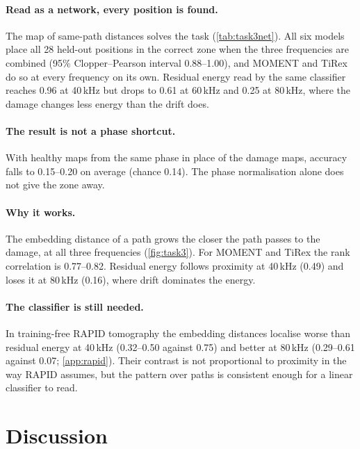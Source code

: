 \documentclass{article}
\begin{document}
\paragraph{Read as a network, every position is found.}
The map of same-path distances solves the task (\cref{tab:task3net}). All six models place all 28 held-out
positions in the correct zone when the three frequencies are combined (95\% Clopper--Pearson interval
0.88--1.00),
and MOMENT and TiRex do so at every frequency on its own. Residual energy read by the same classifier
reaches 0.96 at 40\,kHz but drops to 0.61 at 60\,kHz and 0.25 at 80\,kHz, where the damage changes less
energy than the drift does.

\paragraph{The result is not a phase shortcut.}
With healthy maps from the same phase in place of the damage maps, accuracy falls to 0.15--0.20 on average
(chance 0.14). The phase normalisation alone does not give the zone away.



\paragraph{Why it works.}
The embedding distance of a path grows the closer the path passes to the damage, at all three
frequencies (\cref{fig:task3}). For MOMENT and TiRex the rank correlation is 0.77--0.82. Residual energy
follows proximity at 40\,kHz (0.49) and loses it at 80\,kHz (0.16), where drift dominates the energy.

\paragraph{The classifier is still needed.}
In training-free RAPID tomography the embedding distances localise worse than residual energy at 40\,kHz
(0.32--0.50 against 0.75) and better at 80\,kHz (0.29--0.61 against 0.07; \cref{app:rapid}). Their contrast
is not proportional to proximity in the way RAPID assumes, but the pattern over paths is consistent enough
for a linear classifier to read.

\section{Discussion}
\label{sec:discussion}
\end{document}
